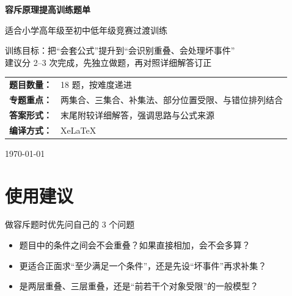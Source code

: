 \documentclass[11pt,a4paper,fontset=fandol]{ctexart}
\theoremstyle{formalexample}
\begin{document}
\thispagestyle{empty}
\begin{titlepage}
\centering
\vspace*{0.9cm}
\begin{tcolorbox}[
  enhanced,
  width=0.92\textwidth,
  colback=white,
  colframe=mainblue,
  boxrule=1pt,
  arc=0mm,
  left=6mm,
  right=6mm,
  top=8mm,
  bottom=8mm
]
\centering
{\fontsize{24}{30}\selectfont\bfseries 容斥原理提高训练题单\par}
\vspace{0.6cm}
{\fontsize{17}{22}\selectfont 适合小学高年级至初中低年级竞赛过渡训练\par}

\vspace{1cm}
\begin{tcolorbox}[colback=lightblue,colframe=mainblue,width=0.84\textwidth,boxrule=1pt]
\centering
{\large 训练目标：把“会套公式”提升到“会识别重叠、会处理坏事件”}\\[0.35em]
{\normalsize 建议分 2--3 次完成，先独立做题，再对照详细解答订正}
\end{tcolorbox}

\vspace{1cm}
\renewcommand{\arraystretch}{1.42}
\begin{tabular}{>{\bfseries}p{3.5cm}p{8cm}}
题目数量： & 18 题，按难度递进 \\
专题重点： & 两集合、三集合、补集法、部分位置受限、与错位排列结合 \\
答案形式： & 末尾附较详细解答，强调思路与公式来源 \\
编译方式： & XeLaTeX \\
\end{tabular}

\vspace{0.9cm}
{\large \today\par}
\end{tcolorbox}
\end{titlepage}

\tableofcontents
\newpage

\section{使用建议}

\begin{goalbox}{做容斥题时优先问自己的 3 个问题}
\begin{itemize}
  \item 题目中的条件之间会不会重叠？如果直接相加，会不会多算？
  \item 更适合正面求“至少满足一个条件”，还是先设“坏事件”再求补集？
  \item 是两层重叠、三层重叠，还是“前若干个对象受限”的一般模型？
\end{itemize}
\end{goalbox}
\end{document}
